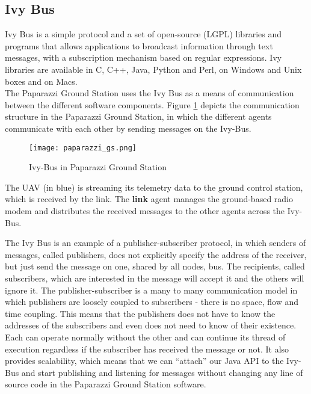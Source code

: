 \subsection{Ivy Bus}
Ivy Bus is a simple protocol and a set of open-source (LGPL) libraries and programs that allows applications to broadcast information through text messages, with a subscription mechanism based on regular expressions. Ivy libraries are available in C, C++, Java, Python and Perl, on Windows and Unix boxes and on Macs. \\
The Paparazzi Ground Station uses the Ivy Bus as a means of communication between the different software components. Figure \ref{fig:paparazziGS} depicts the communication structure in the Paparazzi Ground Station, in which the different agents communicate with each other by sending messages on the Ivy-Bus.

\begin{figure}[h!]
 \begin{center}
  \texttt{[image: paparazzi\_gs.png]}
 \end{center}
  \caption{Ivy-Bus in Paparazzi Ground Station\label{fig:paparazziGS}}
\end{figure}

The UAV (in blue) is streaming its telemetry data to the ground control station, which is received by the link. The \textbf{link} agent manages the ground-based radio modem and distributes the received messages to the other agents across the Ivy-Bus.

The Ivy Bus is an example of a publisher-subscriber protocol, in which senders of messages, called publishers, does not  explicitly specify the address of the receiver, but just send the message on one, shared by all nodes, bus. The recipients, called subscribers, which are interested in the message will accept it and the others will ignore it. The publisher-subscriber is a many to many communication model in which publishers are loosely coupled to subscribers - there is no space, flow and time coupling. This means that the publishers does not have to know the addresses of the subscribers and even does not need to know of their existence. Each can operate normally without the other and can continue its thread of execution regardless if the subscriber has received the message or not. It also provides scalability, which means that we can “attach” our Java API to the Ivy-Bus and start publishing and listening for messages without changing any line of source code in the Paparazzi Ground Station software.

